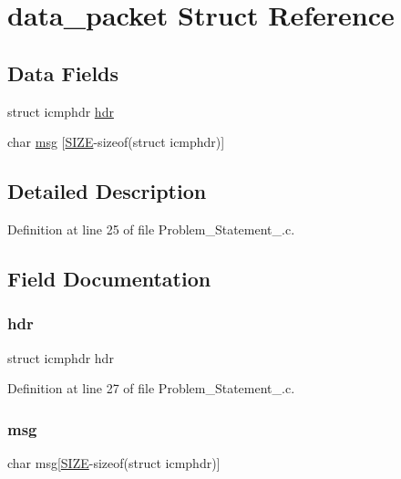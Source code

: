 \hypertarget{structdata__packet}{}\section{data\+\_\+packet Struct Reference}
\label{structdata__packet}
\subsection*{Data Fields}
\begin{DoxyCompactItemize}
\item 
struct icmphdr \mbox{\hyperlink{structdata__packet_a9ab52da9b6fcaa57cd0207e68b742e81}{hdr}}
\item 
char \mbox{\hyperlink{structdata__packet_a93bad7a77e684954895b5fcdb26b4a57}{msg}} \mbox{[}\mbox{\hyperlink{_problem___statement__3_8c_a70ed59adcb4159ac551058053e649640}{S\+I\+ZE}}-\/sizeof(struct icmphdr)\mbox{]}
\end{DoxyCompactItemize}


\subsection{Detailed Description}


Definition at line 25 of file Problem\+\_\+\+Statement\+\_.\+c.



\subsection{Field Documentation}
\mbox{\label{structdata__packet_a9ab52da9b6fcaa57cd0207e68b742e81}} 
\subsubsection{\texorpdfstring{hdr}{hdr}}
{\footnotesize\ttfamily struct icmphdr hdr}



Definition at line 27 of file Problem\+\_\+\+Statement\+\_.\+c.

\mbox{\label{structdata__packet_a93bad7a77e684954895b5fcdb26b4a57}} 
\subsubsection{\texorpdfstring{msg}{msg}}
{\footnotesize\ttfamily char msg\mbox{[}\mbox{\hyperlink{_problem___statement__3_8c_a70ed59adcb4159ac551058053e649640}{S\+I\+ZE}}-\/sizeof(struct icmphdr)\mbox{]}}



